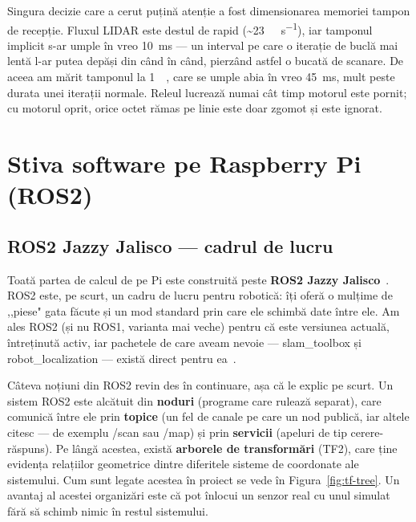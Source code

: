 \documentclass[a4paper,12pt,twoside,openany]{report}
\renewcommand{\texttt}[1]{\textnormal{#1}}
\begin{document}
Singura decizie care a cerut puțină atenție a fost dimensionarea memoriei
tampon de recepție. Fluxul LIDAR este destul de rapid
(\textasciitilde\SI{23}{\kilo\byte\per\second}), iar tamponul implicit s-ar
umple în vreo \SI{10}{\milli\second} — un interval pe care o iterație de buclă
mai lentă l-ar putea depăși din când în când, pierzând astfel o bucată de
scanare. De aceea am mărit tamponul la \SI{1}{\kilo\byte}, care se umple abia
în vreo \SI{45}{\milli\second}, mult peste durata unei iterații normale.
Releul lucrează numai cât timp motorul este pornit; cu motorul oprit, orice
octet rămas pe linie este doar zgomot și este ignorat.

\clearpage

\chapter{Stiva software pe Raspberry Pi (ROS2)}
\label{cap:ros2}

\section{ROS2 Jazzy Jalisco — cadrul de lucru}
\label{sec:ros2-overview}

Toată partea de calcul de pe Pi este construită peste \textbf{ROS2 Jazzy
Jalisco}~\cite{ros2jazzy}. ROS2 este, pe scurt, un cadru de lucru pentru
robotică: îți oferă o mulțime de ,,piese" gata făcute și un mod standard prin
care ele schimbă date între ele. Am ales ROS2 (și nu ROS1, varianta mai veche)
pentru că este versiunea actuală, întreținută activ, iar pachetele de care
aveam nevoie — slam\_toolbox și robot\_localization — există direct pentru
ea~\cite{maruyama2016ros2, ros2why, ros2macenski}.

Câteva noțiuni din ROS2 revin des în continuare, așa că le explic pe scurt.
Un sistem ROS2 este alcătuit din \textbf{noduri} (programe care rulează separat),
care comunică între ele prin \textbf{topice} (un fel de canale pe care un nod
publică, iar altele citesc — de exemplu \texttt{/scan} sau \texttt{/map}) și
prin \textbf{servicii} (apeluri de tip cerere-răspuns). Pe lângă acestea,
există \textbf{arborele de transformări} (TF2), care ține evidența relațiilor
geometrice dintre diferitele sisteme de coordonate ale sistemului. Cum sunt
legate acestea în proiect se vede în Figura~\ref{fig:tf-tree}. Un avantaj al
acestei organizări este că pot înlocui un senzor real cu unul simulat fără să
schimb nimic în restul sistemului.
\end{document}
